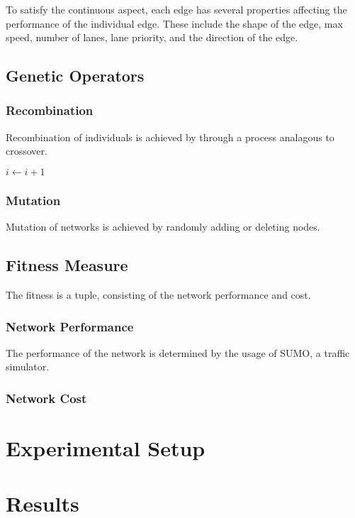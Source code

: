 \documentclass[11pt, oneside, notitlepage, draft]{article}
\begin{document}
        To satisfy the continuous aspect, each edge has several properties affecting the performance of the individual edge. These include the shape of the edge, max speed, number of lanes, lane priority, and the direction of the edge.


    \subsection{Genetic Operators}
        \subsubsection{Recombination}
            Recombination of individuals is achieved by through a process analagous to crossover.
            \begin{algorithmic}
            \STATE $i \leftarrow i + 1$
            \ENDFOR
            \end{algorithmic}

        \subsubsection{Mutation}
            Mutation of networks is achieved by randomly adding or deleting nodes. 
    \subsection{Fitness Measure}
        The fitness is a tuple, consisting of the network performance and cost. 

        \subsubsection{Network Performance}
            The performance of the network is determined by the usage of SUMO, a traffic simulator.
        \subsubsection{Network Cost}



\section{Experimental Setup}

\section{Results}
\end{document}
